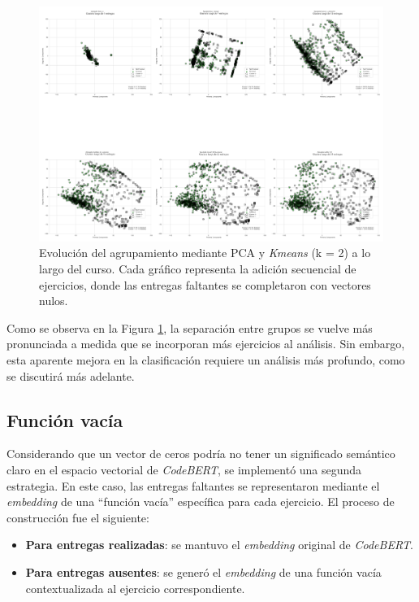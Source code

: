 \documentclass[11pt,a4paper,twoside,openany]{tesis}
\begin{document}
\begin{figure}[H]
    \centering
    \includegraphics[width=\textwidth]{imagenes/fill functiontodos_los_graficos_en_una_sola_figura_6.png}
    \caption{Evolución del agrupamiento mediante PCA y \emph{Kmeans} (k = 2) a lo largo del curso. Cada gráfico representa la adición secuencial de ejercicios, donde las entregas faltantes se completaron con vectores nulos.}
    \label{fig: zeros}
\end{figure}

Como se observa en la Figura \ref{fig: zeros}, la separación entre grupos se vuelve más pronunciada a medida que se incorporan más ejercicios al análisis. Sin embargo, esta aparente mejora en la clasificación requiere un análisis más profundo, como se discutirá más adelante.

\subsection{Función vacía}

Considerando que un vector de ceros podría no tener un significado semántico claro en el espacio vectorial de \emph{CodeBERT}, se implementó una segunda estrategia. En este caso, las entregas faltantes se representaron mediante el \emph{embedding} de una ``función vacía'' específica para cada ejercicio. El proceso de construcción fue el siguiente:

\begin{itemize}
    \item \textbf{Para entregas realizadas}: se mantuvo el \emph{embedding} original de \emph{CodeBERT}.
    \item \textbf{Para entregas ausentes}: se generó el \emph{embedding} de una función vacía contextualizada al ejercicio correspondiente.
\end{itemize}
\end{document}
